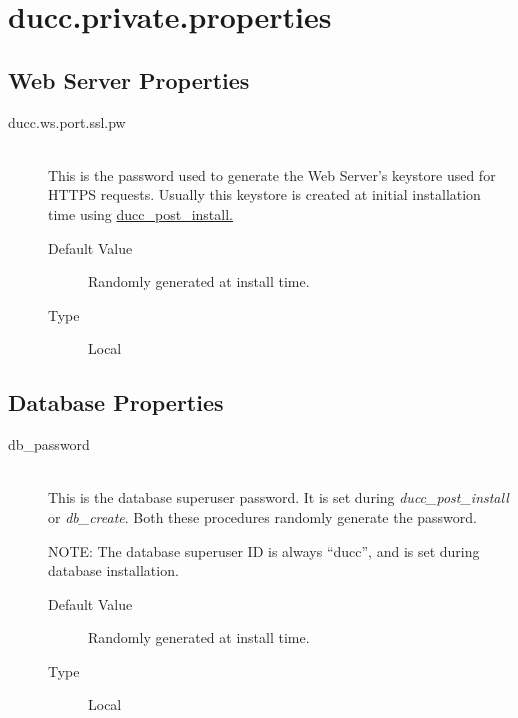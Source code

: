 \section{ducc.private.properties}
\label{sec:ducc.private.properties}

\subsection{Web Server Properties}

    \begin{description}
    
        \item[ducc.ws.port.ssl.pw] \hfill \\
          This is the password used to generate the Web Server's keystore used for HTTPS requests.  Usually
          this keystore is created at initial installation time using \hyperref[subsec:admin.ducc-post-installl]{ducc\_post\_install.}
          \begin{description}
            \item[Default Value] Randomly generated at install time. 
            \item[Type] Local
          \end{description}
    \end{description}    
        

\subsection{Database Properties}

    \begin{description}
    
        \item[db\_password] \hfill \\
          This is the database superuser password.  It is set during {\em ducc\_post\_install} or {\em db\_create}.  Both
          these procedures randomly generate the password.

          NOTE: The database superuser ID is always ``ducc'', and is set during database installation.
          \begin{description}
            \item[Default Value] Randomly generated at install time.
            \item[Type] Local
          \end{description}
    \end{description}    
        
